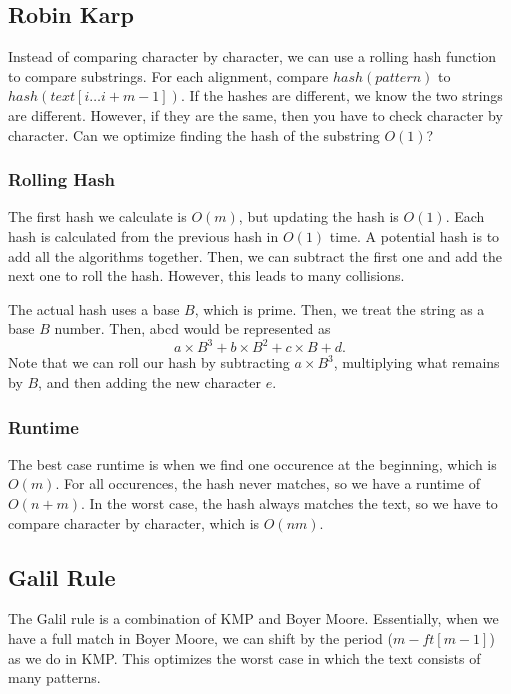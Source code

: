 
\subsection{Robin Karp}

Instead of comparing character by character, we can use a rolling hash function to compare substrings. For each alignment, compare \( hash(pattern) \) to \( hash(text[i\ldots i+m-1]) \). If the hashes are different, we know the two strings are different. However, if they are the same, then you have to check character by character. Can we optimize finding the hash of the substring \( O(1) \)?

\subsubsection{Rolling Hash}
The first hash we calculate is \( O(m) \), but updating the hash is \( O(1) \). Each hash is calculated from the previous hash in \( O(1) \) time. A potential hash is to add all the algorithms together. Then, we can subtract the first one and add the next one to roll the hash. However, this leads to many collisions.

The actual hash uses a base \( B \), which is prime. Then, we treat the string as a base \( B \) number. Then, abcd would be represented as \[
	a \times B^3 + b \times B^2 + c \times B + d
.\] Note that we can roll our hash by subtracting \( a \times B^3 \), multiplying what remains by \( B \), and then adding the new character \( e \). 

\subsubsection{Runtime}
The best case runtime is when we find one occurence at the beginning, which is \( O(m) \). For all occurences, the hash never matches, so we have a runtime of \( O(n+m) \). In the worst case, the hash always matches the text, so we have to compare character by character, which is \( O(nm) \). 

\subsection{Galil Rule}
The Galil rule is a combination of KMP and Boyer Moore. Essentially, when we have a full match in Boyer Moore, we can shift by the period (\( m-ft[m-1] \)) as we do in KMP. This optimizes the worst case in which the text consists of many patterns.
